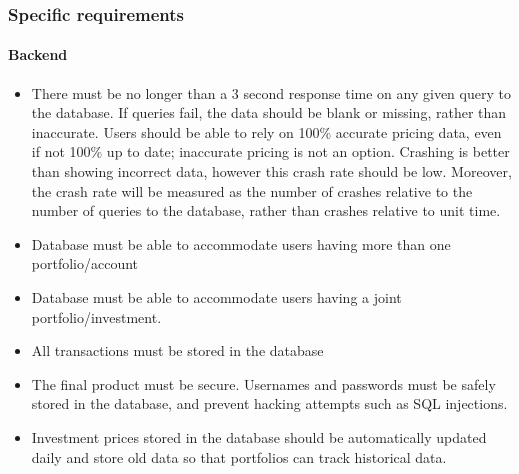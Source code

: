 \documentclass[onecolumn, draftclsnofoot,10pt, compsoc]{IEEEtran}
\begin{document}
\subsubsection{Specific requirements}

\paragraph{Backend}

\begin{itemize}
\item There must be no longer than a 3 second response time on any given query to the database. If queries fail, the data should be blank or missing, 
		rather than inaccurate. Users should be able to rely on 100\% accurate pricing data, even if not 100\% up to date; inaccurate pricing is not an option. Crashing is better than showing incorrect data, however this crash rate should be low. Moreover, the crash rate will be measured as the number of crashes relative to the number of queries to the database, rather than crashes relative to unit time.

\item Database must be able to accommodate users having more than one portfolio/account
\item Database must be able to accommodate users having a joint portfolio/investment.
\item All transactions must be stored in the database
\item The final product must be secure. Usernames and passwords must be safely stored in the database, and prevent hacking attempts such as SQL injections.
\item Investment prices stored in the database should be automatically updated daily and store old data so that portfolios can track historical data.
\end{itemize}
\end{document}
